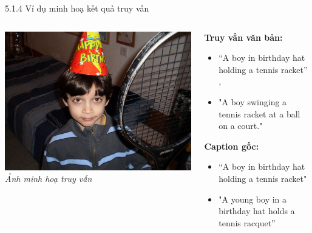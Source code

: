 \begin{frame}{5.1.4 Ví dụ minh hoạ kết quả truy vấn}
\begin{columns}
    \begin{column}{0.5\textwidth}
        \centering
        \includegraphics[width=0.95\linewidth]{img/05-imagecaption.png} %
        \vspace{0.5em}
        \textit{Ảnh minh hoạ truy vấn}
    \end{column}

    \begin{column}{0.5\textwidth}
        \textbf{Truy vấn văn bản:} 
         \begin{itemize}
        \item “A boy in birthday hat holding a tennis racket” , 
        \item "A boy swinging a tennis racket at a ball on a court."
        \end{itemize}

        \vspace{1em}

        \textbf{Caption gốc:}
        \begin{itemize}
            \item “A boy in birthday hat holding a tennis racket"
            \item "A young boy in a birthday hat holds a tennis racquet”
        \end{itemize}
    \end{column}
\end{columns}
\end{frame}


